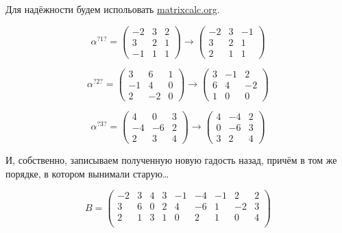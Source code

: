 \documentclass[12pt, a4paper]{article}
\newcommand\arr[2]{\left(\begin{array}{#1}#2\end{array}\right)}
\begin{document}
    Для надёжности будем испольовать \url{matrixcalc.org}.

    \begin{equation}
        \alpha^{?1?} = \left(\begin{matrix}
            -2 & 3 & 2 \\
            3 & 2 & 1 \\
            -1 & 1 & 1
        \end{matrix}\right) \rightarrow \left(\begin{matrix}
            -2 & 3 & -1 \\
            3 & 2 & 1 \\
            2 & 1 & 1
        \end{matrix}\right)
    \end{equation}

    \begin{equation}
        \alpha^{?2?} = \left(\begin{matrix}
            3 & 6 & 1 \\
            -1 & 4 & 0 \\
            2 & -2 & 0
        \end{matrix}\right) \rightarrow \left(\begin{matrix}
            3 & -1 & 2 \\
            6 & 4 & -2 \\
            1 & 0 & 0
        \end{matrix}\right)
    \end{equation}


    \begin{equation}
        \alpha^{?3?} = \left(\begin{matrix}
            4 & 0 & 3 \\
            -4 & -6 & 2 \\
            2 & 3 & 4
        \end{matrix}\right) \rightarrow \left(\begin{matrix}
            4 & -4 & 2 \\
            0 & -6 & 3 \\
            3 & 2 & 4
        \end{matrix}\right)
    \end{equation}


    И, собственно, записываем полученную новую гадость назад, причём в том же порядке, в котором вынимали старую…

    \begin{equation}
        B = \arr{ccc|ccc|ccc}{
            -2 & 3 & 4     & 3 & -1 & -4      & -1 & 2 & 2 \\
            3 & 6 & 0    & 2  & 4 & -6     & 1 & -2 & 3 \\
            2 & 1 & 3     &  1 & 0 & 2     & 1 & 0 & 4 \\
        }
    \end{equation}
    
\end{document}
